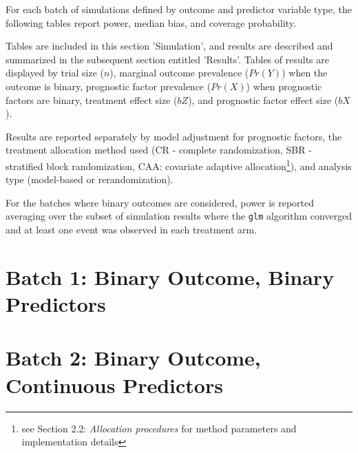 For each batch of simulations defined by outcome and predictor variable type, the following tables report power, median bias, and coverage probability.

Tables are included in this section 'Simulation', and results are described and summarized in the subsequent section entitled 'Results'.
Tables of results are displayed by trial size ($n$), marginal outcome prevalence ($Pr( Y )$) when the outcome is binary, prognostic factor prevalence ($Pr( X )$) when prognostic factors are binary, treatment effect size ($bZ$), and prognostic factor effect size ($bX$).

Results are reported separately by model adjustment for prognostic factors, 
the treatment allocation method used (CR - complete randomization, SBR - stratified block randomization, CAA: covariate adaptive allocation\footnote{see Section 2.2: \textit{Allocation procedures} for method parameters and implementation details}), 
and analysis type (model-based or rerandomization).

For the batches where binary outcomes are considered, power is reported averaging over the subset of simulation results where the \texttt{glm} algorithm converged and at least one event was observed in each treatment arm.

\section[Binary Y, binary X]{Batch 1: Binary Outcome, Binary Predictors}


 \newpage 
 \newpage
 \newpage

 \newpage 


\section[Binary Y, continuous X]{Batch 2: Binary Outcome, Continuous Predictors}


